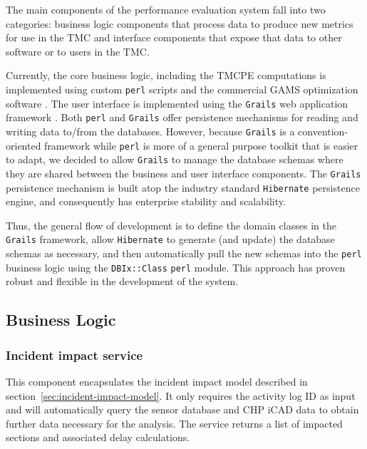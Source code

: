 \documentclass[12pt]{report}
\begin{document}
The main components of the performance evaluation system fall into two
categories: business logic components that process data to produce new metrics
for use in the \ac{TMC} and interface components that expose that data to other
software or to users in the \ac{TMC}.  

Currently, the core business logic, including the \ac{TMCPE} computations is
implemented using custom \texttt{perl} scripts and the commercial \ac{GAMS}
optimization software \citep{rosenthal10:_gams}.  The user interface is
implemented using the \texttt{Grails} web application framework
\citep{rocher09:_grail_framew_refer_docum}.  Both \texttt{perl} and
\texttt{Grails} offer persistence mechanisms for reading and writing data
to/from the databases.  However, because \texttt{Grails} is a
convention-oriented framework while \texttt{perl} is more of a general purpose
toolkit that is easier to adapt, we decided to allow \texttt{Grails} to manage
the database schemas where they are shared between the business and user
interface components.  The \texttt{Grails} persistence mechanism is built atop
the industry standard \texttt{Hibernate} persistence
\citep{king10:_hiber_relat_persis_idiom_java} engine, and consequently has
enterprise stability and scalability.

Thus, the general flow of development is to define the domain classes in the
\texttt{Grails} framework, allow \texttt{Hibernate} to generate (and update) the
database schemas as necessary, and then automatically pull the new schemas into
the \texttt{perl} business logic using the \texttt{DBIx::Class} \texttt{perl}
module.  This approach has proven robust and flexible in the development of the
system.


\subsection{Business Logic}
\label{sec:logic}


\subsubsection{Incident impact service}

\label{sec:incident-impact-service}

This component encapsulates the incident impact model described in
section~\ref{sec:incident-impact-model}.  It only requires the
activity log ID as input and will automatically query the sensor
database and \ac{CHP} \ac{iCAD} data to obtain further data necessary
for the analysis.  The service returns a list of impacted sections and
associated delay calculations.
\end{document}
